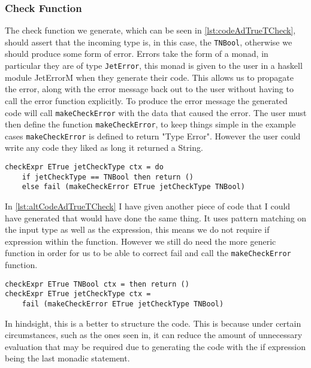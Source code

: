 \subsubsection{Check Function}
The check function we generate, which can be seen in \autoref{lst:codeAdTrueTCheck}, should assert that the incoming type is, in this case, the \texttt{TNBool}, otherwise we should produce some form of error.
Errors take the form of a monad, in particular they are of type \texttt{JetError}, this monad is given to the user in a haskell module JetErrorM when they generate their code.
This allows us to propagate the error, along with the error message back out to the user without having to call the error function explicitly.
To produce the error message the generated code will call \texttt{makeCheckError} with the data that caused the error.
The user must then define the function \texttt{makeCheckError}, to keep things simple in the example cases \texttt{makeCheckError} is defined to return "Type Error".
However the user could write any code they liked as long it returned a String.

\begin{lstlisting}[caption = Code generated for checkExpr from AdTrueT, label=lst:codeAdTrueTCheck]
checkExpr ETrue jetCheckType ctx = do
    if jetCheckType == TNBool then return () 
    else fail (makeCheckError ETrue jetCheckType TNBool)
\end{lstlisting}

In \autoref{lst:altCodeAdTrueTCheck} I have given another piece of code that I could have generated that would have done the same thing.
It uses pattern matching on the input type as well as the expression, this means we do not require if expression within the function.
However we still do need the more generic function in order for us to be able to correct fail and call the \texttt{makeCheckError} function.

\begin{lstlisting}[caption = Alternate Code for checkExpr from AdTrueT, label=lst:altCodeAdTrueTCheck]
checkExpr ETrue TNBool ctx = then return () 
checkExpr ETrue jetCheckType ctx = 
    fail (makeCheckError ETrue jetCheckType TNBool)
\end{lstlisting}

In hindsight, this is a better to structure the code.
This is because under certain circumstances, such as the ones seen in, it can reduce the amount of unnecessary evaluation that may be required due to generating the code with the if expression being the last monadic statement.

